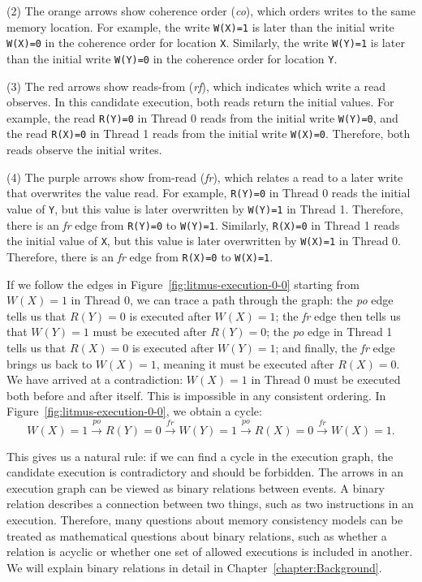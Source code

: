 (2) The orange arrows show coherence order (\textit{co}), which orders writes to the same memory location. For example, the write \texttt{W(X)=1} is later than the initial write \texttt{W(X)=0} in the coherence order for location \texttt{X}. Similarly, the write \texttt{W(Y)=1} is later than the initial write \texttt{W(Y)=0} in the coherence order for location \texttt{Y}.

(3) The red arrows show reads-from (\textit{rf}), which indicates which write a read observes. In this candidate execution, both reads return the initial values. For example, the read \texttt{R(Y)=0} in Thread 0 reads from the initial write \texttt{W(Y)=0}, and the read \texttt{R(X)=0} in Thread 1 reads from the initial write \texttt{W(X)=0}. Therefore, both reads observe the initial writes.

(4) The purple arrows show from-read (\textit{fr}), which relates a read to a later write that overwrites the value read. For example, \texttt{R(Y)=0} in Thread 0 reads the initial value of \texttt{Y}, but this value is later overwritten by \texttt{W(Y)=1} in Thread 1. Therefore, there is an \textit{fr} edge from \texttt{R(Y)=0} to \texttt{W(Y)=1}. Similarly, \texttt{R(X)=0} in Thread 1 reads the initial value of \texttt{X}, but this value is later overwritten by \texttt{W(X)=1} in Thread 0. Therefore, there is an \textit{fr} edge from \texttt{R(X)=0} to \texttt{W(X)=1}.

If we follow the edges in Figure~\ref{fig:litmus-execution-0-0} starting from $W(X)=1$ in Thread 0, we can trace a path through the graph: the \textit{po} edge tells us that $R(Y)=0$ is executed after $W(X)=1$; the \textit{fr} edge 
then tells us that $W(Y)=1$ must be executed after $R(Y)=0$; the \textit{po} edge in Thread 1 tells us that $R(X)=0$ is executed after $W(Y)=1$; and finally, the \textit{fr} edge brings us back to $W(X)=1$, meaning it must be executed after $R(X)=0$. We have arrived at a contradiction: $W(X)=1$ in Thread 0 must be executed both before and after itself. This is impossible in any consistent ordering. In Figure~\ref{fig:litmus-execution-0-0}, we obtain a cycle:
\[
W(X)=1 \xrightarrow{po} R(Y)=0 \xrightarrow{fr} W(Y)=1 \xrightarrow{po} R(X)=0 \xrightarrow{fr} W(X)=1.
\]

This gives us a natural rule: if we can find a cycle in the execution graph, the candidate execution is contradictory and should be forbidden. The arrows in an execution graph can be viewed as binary relations between events. A binary relation describes a connection between two things, such as two instructions in an execution. Therefore, many questions about memory consistency models can be treated as mathematical questions about binary relations, such as whether a relation is acyclic or whether one set of allowed executions is included in another. We will explain binary relations in detail in Chapter~\ref{chapter:Background}.

